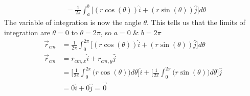 \documentclass[a4paper]{article}
\begin{document}
\begin{shaded}
\begin{align*}
        &= \frac{1}{2\pi}\int_{a}^{b} \Big[(r\cos(\theta))\hat{i} + (r\sin(\theta))\hat{j}\Big] d\theta
    \end{align*}
    The variable of integration is now the angle $\theta$. This tells us that the limits of integration are $\theta = 0$ to $\theta = 2\pi$, so $a = 0$ \& $b = 2\pi$
    \begin{align*}
        \vec{r}_{cm} &= \frac{1}{2\pi}\int_{0}^{2\pi} \Big[(r\cos(\theta))\hat{i} + (r\sin(\theta))\hat{j}\Big] d\theta\\
        \vec{r}_{cm} &= r_{cm,x}\hat{i} + r_{cm,y}\hat{j}\\
        &= \bigg[\frac{1}{2\pi}\int_{0}^{2\pi}\big(r\cos(\theta)\big)d\theta\bigg]\hat{i} + \bigg[\frac{1}{2\pi}\int_{0}^{2\pi}\big(r\sin(\theta)\big)d\theta\bigg]\hat{j}\\
        &= 0\hat{i} + 0\hat{j} = \vec{0}
    \end{align*}
\end{shaded}
\newpage
\end{document}
